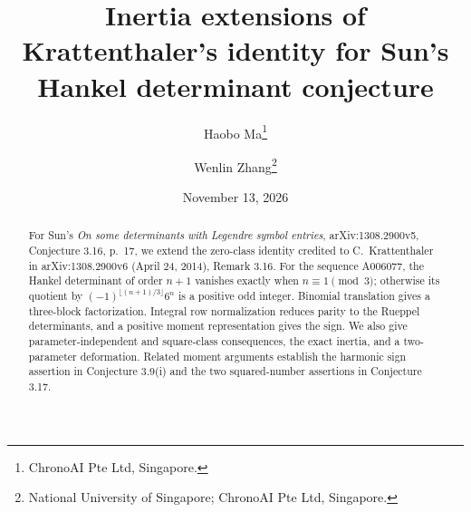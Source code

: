 \documentclass[11pt]{article}
\title{Inertia extensions of Krattenthaler's identity for Sun's Hankel determinant conjecture}
\author{Haobo Ma\thanks{ChronoAI Pte Ltd, Singapore.}\and
Wenlin Zhang\thanks{National University of Singapore; ChronoAI Pte Ltd, Singapore.}}
\date{November 13, 2026}
\begin{document}
\maketitle
\begin{abstract}
For Sun's \emph{On some determinants with Legendre symbol entries},
arXiv:1308.2900v5, Conjecture 3.16, p.~17, we extend the zero-class
identity credited to C.\ Krattenthaler in arXiv:1308.2900v6
(April 24, 2014), Remark 3.16.
For the sequence A006077, the Hankel determinant of order $n+1$ vanishes
exactly when $n\equiv1\pmod3$; otherwise its quotient by
$(-1)^{\lfloor(n+1)/3\rfloor}6^n$ is a positive odd integer.
Binomial translation gives a three-block factorization. Integral row
normalization reduces parity to the Rueppel determinants, and a positive
moment representation gives the sign. We also give parameter-independent
and square-class consequences, the exact inertia, and a two-parameter
deformation. Related moment arguments establish the harmonic sign assertion
in Conjecture 3.9(i) and the two squared-number assertions in Conjecture 3.17.
\end{abstract}
\end{document}

